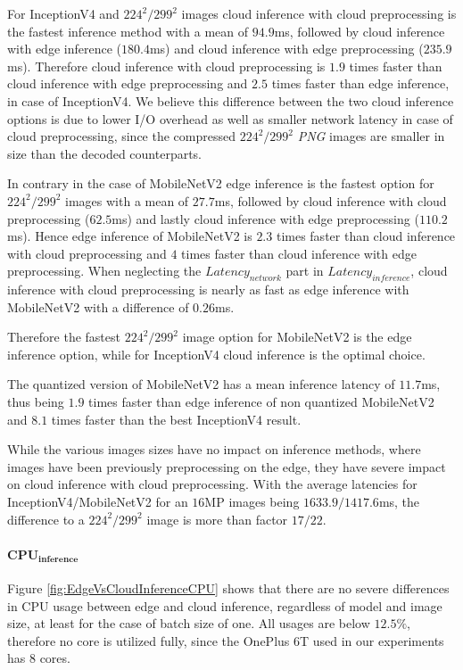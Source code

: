 For InceptionV4 and $224^2/299^2$ images cloud inference with cloud preprocessing is the fastest inference method with a mean of $94.9$ms, followed by cloud inference with edge inference ($180.4$ms) and cloud inference with edge preprocessing ($235.9$ms).
Therefore cloud inference with cloud preprocessing is $1.9$ times faster than cloud inference with edge preprocessing and $2.5$ times faster than edge inference, in case of InceptionV4.
We believe this difference between the two cloud inference options is due to lower I/O overhead as well as smaller network latency in case of cloud preprocessing, since the compressed $224^2/299^2$ \emph{PNG} images are smaller in size than the decoded counterparts. 

In contrary in the case of MobileNetV2 edge inference is the fastest option for $224^2/299^2$ images with a mean of $27.7$ms, followed by cloud inference with cloud preprocessing ($62.5$ms) and lastly cloud inference with edge preprocessing ($110.2$ms).
Hence edge inference of MobileNetV2 is $2.3$ times faster than cloud inference with cloud preprocessing and $4$ times faster than cloud inference with edge preprocessing.
When neglecting the $Latency_{network}$ part in $Latency_{inference}$, cloud inference with cloud preprocessing is nearly as fast as edge inference with MobileNetV2 with a difference of $0.26$ms.

Therefore the fastest $224^2/299^2$ image option for MobileNetV2 is the edge inference option, while for InceptionV4 cloud inference is the optimal choice.

The quantized version of MobileNetV2 has a mean inference latency of $11.7$ms, thus being $1.9$ times faster than edge inference of non quantized MobileNetV2 and $8.1$ times faster than the best InceptionV4 result.

While the various images sizes have no impact on inference methods, where images have been previously preprocessing on the edge, they have severe impact on cloud inference with cloud preprocessing.
With the average latencies for InceptionV4/MobileNetV2 for an $16$MP images being $1633.9/1417.6$ms, the difference to a $224^2/299^2$ image is more than factor $17/22$.

\paragraph{$\mathbf{CPU_{inference}}$}
Figure \ref{fig:EdgeVsCloudInferenceCPU} shows that there are no severe differences in CPU usage between edge and cloud inference, regardless of model and image size, at least for the case of batch size of one.
All usages are below $12.5\%$, therefore no core is utilized fully, since the OnePlus 6T used in our experiments has $8$ cores.



